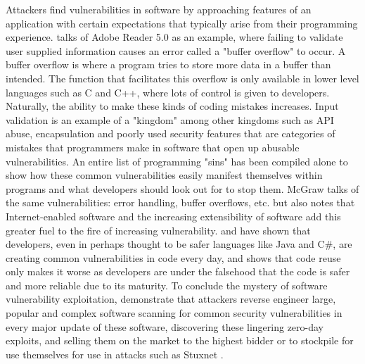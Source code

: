 \documentclass[a4paper, 11pt]{article}
\begin{document}
Attackers find vulnerabilities in software by approaching features of an application with certain expectations that typically arise from their programming experience. \cite{ref:sinstsipenyuk2005seven} talks of Adobe Reader 5.0 as an example, where failing to validate user supplied information causes an error called a "buffer overflow" to occur. A buffer overflow is where a program tries to store more data in a buffer than intended. \cite{ref:jang2014survey} The function that facilitates this overflow is only available in lower level languages such as C and C++, where lots of control is given to developers. Naturally, the ability to make these kinds of coding mistakes increases. Input validation is an example of a "kingdom" among other kingdoms such as API abuse, encapsulation and poorly used security features that are categories of mistakes that programmers make in software that open up abusable vulnerabilities. \cite{ref:sinstsipenyuk2005seven} An entire list of programming "sins" has been compiled alone to show how these common vulnerabilities easily manifest themselves within programs and what developers should look out for to stop them. \cite{ref:howardprogrammingsins200519} McGraw \cite{ref:mcgraw2004software} talks of the same vulnerabilities: error handling, buffer overflows, etc. but also notes that Internet-enabled software and the increasing extensibility of software add this greater fuel to the fire of increasing vulnerability. \cite{ref:sinstsipenyuk2005seven, ref:howardprogrammingsins200519} and \cite{ref:mcgraw2004software} have shown that developers, even in perhaps thought to be safer languages like Java and C\#, are creating common vulnerabilities in code every day, and \cite{ref:honeymoonsoftware} shows that code reuse only makes it worse as developers are under the falsehood that the code is safer and more reliable due to its maturity. To conclude the mystery of software vulnerability exploitation, \cite{ref:sinstsipenyuk2005seven,ref:honeymoonsoftware,ref:howardprogrammingsins200519,ref:mcgraw2004software,ref:biometricattackvectors,ref:stuxnet2011report} demonstrate that attackers reverse engineer large, popular and complex software scanning for common security vulnerabilities in every major update of these software, discovering these lingering zero-day exploits, and selling them on the market \cite{ref:jang2014survey} to the highest bidder or to stockpile for use themselves for use in attacks such as Stuxnet \cite{ref:stuxnet2011report}.
\end{document}
